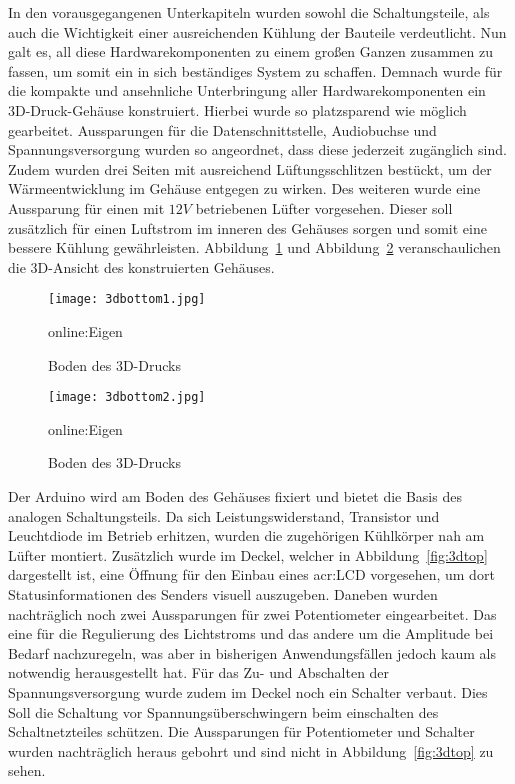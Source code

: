 In den vorausgegangenen Unterkapiteln wurden sowohl die Schaltungsteile, als auch die Wichtigkeit einer ausreichenden Kühlung der Bauteile verdeutlicht. Nun galt es, all diese Hardwarekomponenten zu einem großen Ganzen zusammen zu fassen, um somit ein in sich beständiges System zu schaffen. Demnach wurde für die kompakte und ansehnliche Unterbringung aller Hardwarekomponenten ein 3D-Druck-Gehäuse konstruiert. Hierbei wurde so platzsparend wie möglich gearbeitet. Aussparungen für die Datenschnittstelle, Audiobuchse und Spannungsversorgung wurden so angeordnet, dass diese jederzeit zugänglich sind. Zudem wurden drei Seiten mit ausreichend Lüftungsschlitzen bestückt, um der Wärmeentwicklung im Gehäuse entgegen zu wirken. Des weiteren wurde eine Aussparung für einen mit $12V$ betriebenen Lüfter vorgesehen. Dieser soll zusätzlich für einen Luftstrom im inneren des Gehäuses sorgen und somit eine bessere Kühlung gewährleisten. Abbildung~\ref{fig:3dbottom1} und Abbildung~\ref{fig:3dbottom2} veranschaulichen die 3D-Ansicht des konstruierten Gehäuses.
\begin{figure}[h]
	\centering
	\texttt{[image: 3dbottom1.jpg]}
	\caption[Boden des 3D-Drucks]{Boden des 3D-Drucks} \gls{online:Eigen}
	\label{fig:3dbottom1}
\end{figure}
\begin{figure}[h]
	\centering
	\texttt{[image: 3dbottom2.jpg]}
	\caption[Boden des 3D-Drucks]{Boden des 3D-Drucks} \gls{online:Eigen}
	\label{fig:3dbottom2}
\end{figure}
Der Arduino wird am Boden des Gehäuses fixiert und bietet die Basis des analogen Schaltungsteils. Da sich Leistungswiderstand, Transistor und Leuchtdiode im Betrieb erhitzen, wurden die zugehörigen Kühlkörper nah am Lüfter montiert. Zusätzlich wurde im Deckel, welcher in Abbildung~\ref{fig:3dtop} dargestellt ist, eine Öffnung für den Einbau eines \gls{acr:LCD} vorgesehen, um dort Statusinformationen des Senders visuell auszugeben. Daneben wurden nachträglich noch zwei Aussparungen für zwei Potentiometer eingearbeitet. Das eine für die Regulierung des Lichtstroms und das andere um die Amplitude bei Bedarf nachzuregeln, was aber in bisherigen Anwendungsfällen jedoch kaum als notwendig herausgestellt hat. Für das Zu- und Abschalten der Spannungsversorgung wurde zudem im Deckel noch ein Schalter verbaut. Dies Soll die Schaltung vor Spannungsüberschwingern beim einschalten des Schaltnetzteiles schützen. Die Aussparungen für Potentiometer und Schalter wurden nachträglich heraus gebohrt und sind nicht in Abbildung~\ref{fig:3dtop} zu sehen.



